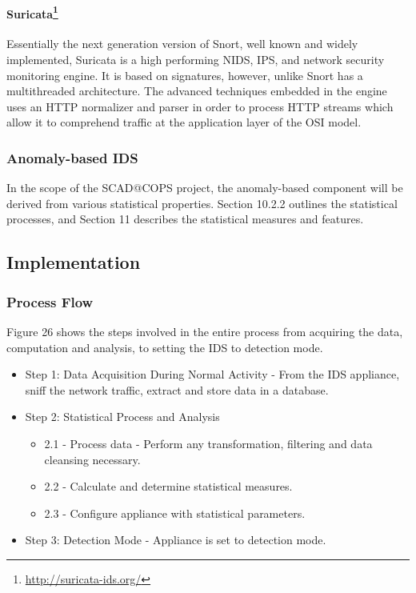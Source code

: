 \documentclass[12pt,]{article}
\begin{document}
\paragraph[Suricata]{Suricata\footnote{\url{http://suricata-ids.org/}}}\label{suricata7}

Essentially the next generation version of Snort, well known and widely
implemented, Suricata is a high performing NIDS, IPS, and network
security monitoring engine. It is based on signatures, however, unlike
Snort has a multithreaded architecture. The advanced techniques embedded
in the engine uses an HTTP normalizer and parser in order to process
HTTP streams which allow it to comprehend traffic at the application
layer of the OSI model.

\subsubsection{Anomaly-based IDS}\label{anomaly-based-ids}

In the scope of the SCAD@COPS project, the anomaly-based component will
be derived from various statistical properties. Section 10.2.2 outlines
the statistical processes, and Section 11 describes the statistical
measures and features.

\subsection{Implementation}\label{implementation}

\subsubsection{Process Flow}\label{process-flow}

Figure 26 shows the steps involved in the entire process from acquiring
the data, computation and analysis, to setting the IDS to detection
mode.

\begin{itemize}
\itemsep1pt\parskip0pt
\item
  Step 1: Data Acquisition During Normal Activity - From the IDS
  appliance, sniff the network traffic, extract and store data in a
  database.
\item
  Step 2: Statistical Process and Analysis

  \begin{itemize}
  \itemsep1pt\parskip0pt
  \item
    2.1 - Process data - Perform any transformation, filtering and data
    cleansing necessary.
  \item
    2.2 - Calculate and determine statistical measures.
  \item
    2.3 - Configure appliance with statistical parameters.
  \end{itemize}
\item
  Step 3: Detection Mode - Appliance is set to detection mode.
\end{itemize}
\end{document}
